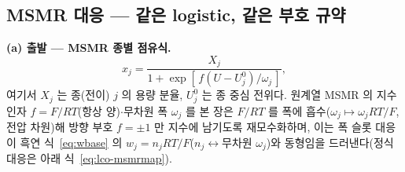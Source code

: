 \subsection{MSMR 대응 --- 같은 logistic, 같은 부호 규약}\label{sec:lco-code-msmr}
\textbf{(a) 출발 --- MSMR 종별 점유식.}
\begin{equation}
x_j=\frac{X_j}{1+\exp[\,f(U-U_j^0)/\omega_j\,]},
\label{eq:msmr}
\end{equation}
여기서 $X_j$ 는 종(전이) $j$ 의 용량 분율, $U_j^0$ 는 종 중심 전위다. 원계열 MSMR 의 지수 인자
$f=F/RT$(항상 양)$\cdot$무차원 폭 $\omega_j$ 를 본 장은 $F/RT$ 를 폭에 흡수($\omega_j\mapsto\omega_jRT/F$,
전압 차원)해 방향 부호 $f=\pm1$ 만 지수에 남기도록 재모수화하며, 이는 폭 슬롯 대응이 흑연
식~\eqref{eq:wbase} 의 $w_j=n_jRT/F$($n_j\leftrightarrow$무차원 $\omega_j$)와 동형임을 드러낸다(정식
대응은 아래 식~\eqref{eq:lco-msmrmap}).
